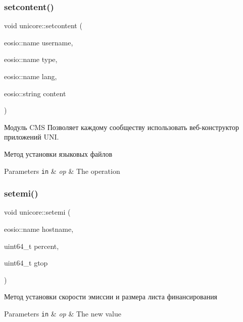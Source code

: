 \subsubsection{\texorpdfstring{setcontent()}{setcontent()}}
{\footnotesize\ttfamily void unicore\+::setcontent (\begin{DoxyParamCaption}\item[{eosio\+::name}]{username,  }\item[{eosio\+::name}]{type,  }\item[{eosio\+::name}]{lang,  }\item[{eosio\+::string}]{content }\end{DoxyParamCaption})}



Модуль C\+MS Позволяет каждому сообществу использовать веб-\/конструктор приложений U\+NI. 

Метод установки языковых файлов


\begin{DoxyParams}[1]{Parameters}
\mbox{\tt in}  & {\em op} & The operation \\
\hline
\end{DoxyParams}
\mbox{\label{classunicore_affa39993f35c8e2c8838a956c761cbcc}} 
\subsubsection{\texorpdfstring{setemi()}{setemi()}}
{\footnotesize\ttfamily void unicore\+::setemi (\begin{DoxyParamCaption}\item[{eosio\+::name}]{hostname,  }\item[{uint64\+\_\+t}]{percent,  }\item[{uint64\+\_\+t}]{gtop }\end{DoxyParamCaption})}



Метод установки скорости эмиссии и размера листа финансирования 


\begin{DoxyParams}[1]{Parameters}
\mbox{\tt in}  & {\em op} & The new value \\
\hline
\end{DoxyParams}
\mbox{\label{classunicore_aa2341c3f2393be329d759ef09f20367f}} 
